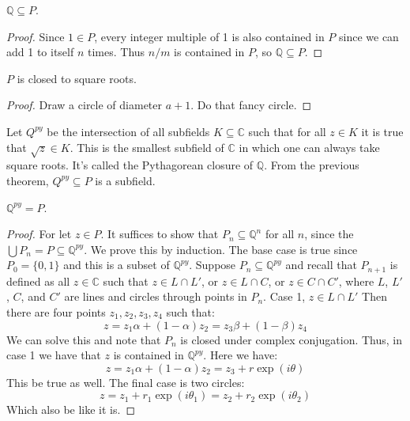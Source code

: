 \documentclass{article}                                                        %
\begin{document}
        \begin{theorem}
            $\mathbb{Q}\subseteq{P}$.
        \end{theorem}
        \begin{proof}
            Since $1\in{P}$, every integer multiple of 1 is also contained in
            $P$ since we can add 1 to itself $n$ times. Thus $n/m$ is contained
            in $P$, so $\mathbb{Q}\subseteq{P}$.
        \end{proof}
        \begin{theorem}
            $P$ is closed to square roots.
        \end{theorem}
        \begin{proof}
            Draw a circle of diameter $a+1$. Do that fancy circle.
        \end{proof}
        Let $Q^{py}$ be the intersection of all subfields $K\subseteq\mathbb{C}$
        such that for all $z\in{K}$ it is true that $\sqrt{z}\in{K}$. This is
        the smallest subfield of $\mathbb{C}$ in which one can always take
        square roots. It's called the Pythagorean closure of $\mathbb{Q}$. From
        the previous theorem, $Q^{py}\subseteq{P}$ is a subfield.
        \begin{theorem}
            $\mathbb{Q}^{py}=P$.
        \end{theorem}
        \begin{proof}
            For let $z\in{P}$. It suffices to show that
            $P_{n}\subseteq\mathbb{Q}^{n}$ for all $n$, since the
            $\bigcup{P}_{n}=P\subseteq\mathbb{Q}^{py}$. We prove this by
            induction. The base case is true since $P_{0}=\{0,1\}$ and this is a
            subset of $\mathbb{Q}^{py}$. Suppose $P_{n}\subseteq\mathbb{Q}^{py}$
            and recall that $P_{n+1}$ is defined as all $z\in\mathbb{C}$ such
            that $z\in{L}\cap{L}'$, or $z\in{L}\cap{C}$, or $z\in{C}\cap{C}'$,
            where $L$, $L'$, $C$, and $C'$ are lines and circles through points
            in $P_{n}$. Case 1, $z\in{L}\cap{L}'$ Then there are four points
            $z_{1},z_{2},z_{3},z_{4}$ such that:
            \begin{equation}
                z=z_{1}\alpha+(1-\alpha)z_{2}=z_{3}\beta+(1-\beta)z_{4}
            \end{equation}
            We can solve this and note that $P_{n}$ is closed under complex
            conjugation. Thus, in case 1 we have that $z$ is contained in
            $\mathbb{Q}^{py}$. Here we have:
            \begin{equation}
                z=z_{1}\alpha+(1-\alpha)z_{2}=z_{3}+r\exp(i\theta)
            \end{equation}
            This be true as well. The final case is two circles:
            \begin{equation}
                z=z_{1}+r_{1}\exp(i\theta_{1})=z_{2}+r_{2}\exp(i\theta_{2})
            \end{equation}
            Which also be like it is.
        \end{proof}
\end{document}
